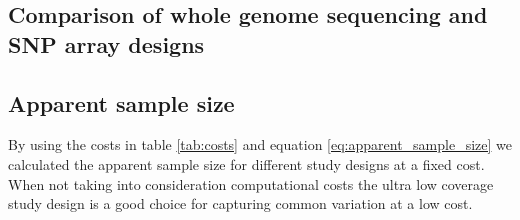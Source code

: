 



\subsection{Comparison of whole genome sequencing and SNP array designs}




\subsection{Apparent sample size}
By using the costs in table \ref{tab:costs} and equation \ref{eq:apparent_sample_size} we calculated the apparent sample size for different study designs at a fixed cost. When not taking into consideration computational costs the ultra low coverage study design is a good choice for capturing common variation at a low cost.

